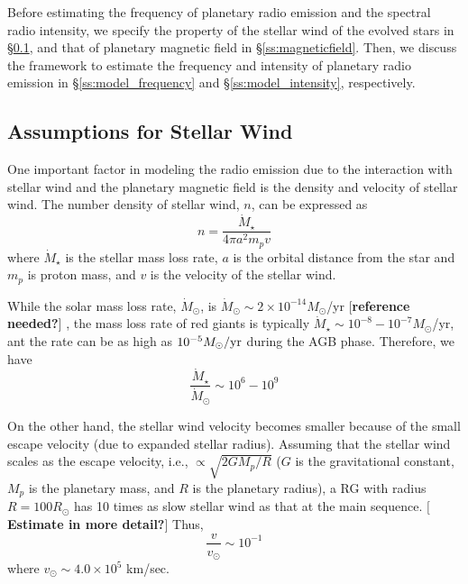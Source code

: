 \documentclass{emulateapj}
\def\memoYF#1{\color{red}$[${\bf #1}$]$ \color{black}}
\def\memoDS#1{\color{blue}$[${\bf #1}$]$ \color{black}}
\begin{document}
Before estimating the frequency of planetary radio emission and the spectral radio intensity, we specify the property of the stellar wind of the evolved stars in \S\ref{ss:stellarwind}, and that of planetary magnetic field in \S\ref{ss:magneticfield}.  
Then, we discuss the framework to estimate the frequency and intensity of planetary radio emission in \S\ref{ss:model_frequency} and \S\ref{ss:model_intensity}, respectively. 



\subsection{Assumptions for Stellar Wind}
\label{ss:stellarwind}

One important factor in modeling the radio emission due to the interaction with stellar wind and the planetary magnetic field is the density and velocity of stellar wind. 
The number density of stellar wind, $n$, can be expressed as
\begin{equation}
n = \frac{\dot M_{\star }}{4\pi a^2 m_p v}
\end{equation}
where $\dot M_{\star }$ is the stellar mass loss rate, $a$ is the orbital distance from the star and $m_p$ is proton mass, and $v$ is the velocity of the stellar wind. 

While the solar mass loss rate, $\dot M_{\odot }$, is $\dot M_{\odot } \sim 2\times 10^{-14} M_{\odot}$/yr \memoYF{reference needed?}, the mass loss rate of red giants is typically $\dot M_{\star } \sim 10^{-8}-10^{-7} M_{\odot}$/yr, ant the rate can be as high as $10^{-5} M_\odot{\rm /yr}$ during the AGB phase. 
Therefore, we have
\begin{equation}
\frac{\dot M_{\star }}{\dot M_{\odot}} \sim 10^6 - 10^9
\end{equation}

On the other hand, the stellar wind velocity becomes smaller because of the small escape velocity (due to expanded stellar radius).
Assuming that the stellar wind scales as the escape velocity, i.e., $\propto \sqrt{2GM_p/R}$ ($G$ is the gravitational constant, $M_p$ is the planetary mass, and $R$ is the planetary radius), a RG with radius $R=100R_{\odot}$ has 10 times as slow stellar wind as that at the main sequence. \memoYF{Estimate in more detail?} Thus, 
\begin{equation}
\frac{v}{v_{\odot}} \sim 10^{-1}
\end{equation}
where $v_{\odot} \sim 4.0 \times 10^5 $ km/sec. 
\end{document}
